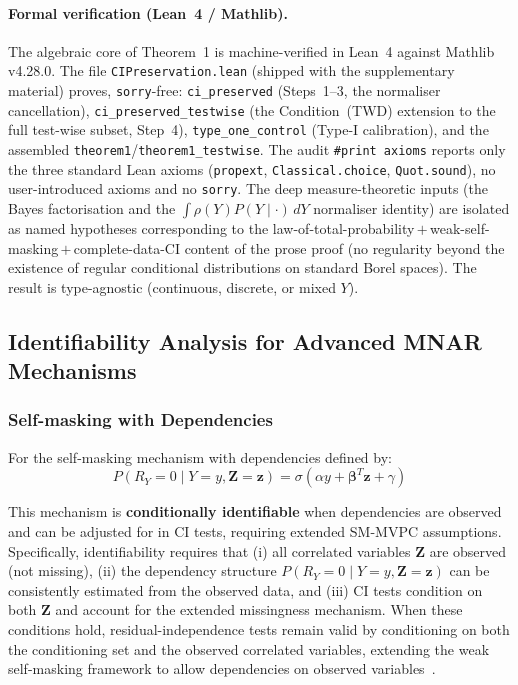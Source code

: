 \documentclass[runningheads]{llncs}
\begin{document}
\paragraph{Formal verification (Lean~4 / Mathlib).} The algebraic core of Theorem~1 is machine-verified in Lean~4 against Mathlib v4.28.0. The file \texttt{CIPreservation.lean} (shipped with the supplementary material) proves, \texttt{sorry}-free: \texttt{ci\_preserved} (Steps~1--3, the normaliser cancellation), \texttt{ci\_preserved\_testwise} (the Condition~(TWD) extension to the full test-wise subset, Step~4), \texttt{type\_one\_control} (Type-I calibration), and the assembled \texttt{theorem1}/\texttt{theorem1\_testwise}. The audit \texttt{\#print axioms} reports only the three standard Lean axioms (\texttt{propext}, \texttt{Classical.choice}, \texttt{Quot.sound}), no user-introduced axioms and no \texttt{sorry}. The deep measure-theoretic inputs (the Bayes factorisation and the $\int\rho(Y)P(Y\mid\cdot)\,dY$ normaliser identity) are isolated as named hypotheses corresponding to the law-of-total-probability\,$+$\,weak-self-masking\,$+$\,complete-data-CI content of the prose proof (no regularity beyond the existence of regular conditional distributions on standard Borel spaces). The result is type-agnostic (continuous, discrete, or mixed $Y$).

\subsection{Identifiability Analysis for Advanced MNAR Mechanisms}

\subsubsection{Self-masking with Dependencies}

For the self-masking mechanism with dependencies defined by:
\begin{equation}
  P(R_Y = 0 \mid Y = y, \mathbf{Z} = \mathbf{z}) = \sigma(\alpha y + \boldsymbol{\beta}^T \mathbf{z} + \gamma)
  \label{eq:sm_dependencies_sm}
\end{equation}

This mechanism is \textbf{conditionally identifiable} when dependencies are observed and can be adjusted for in CI tests, requiring extended SM-MVPC assumptions. Specifically, identifiability requires that (i) all correlated variables $\mathbf{Z}$ are observed (not missing), (ii) the dependency structure $P(R_Y = 0 \mid Y = y, \mathbf{Z} = \mathbf{z})$ can be consistently estimated from the observed data, and (iii) CI tests condition on both $\mathbf{Z}$ and account for the extended missingness mechanism. When these conditions hold, residual-independence tests remain valid by conditioning on both the conditioning set and the observed correlated variables, extending the weak self-masking framework to allow dependencies on observed variables~\cite{qiao2024identification}.
\end{document}
